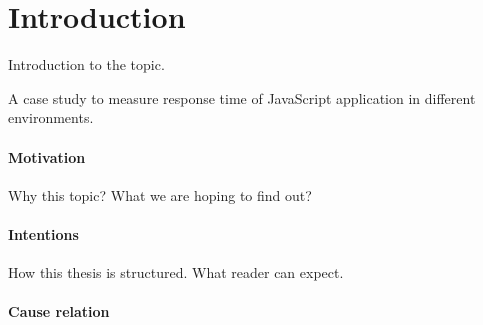\chapter{Introduction\label{intro}}

Introduction to the topic.

A case study to measure response time of JavaScript application in different environments. 

\subsubsection{Motivation}
Why this topic? What we are hoping to find out?

\subsubsection{Intentions}
How this thesis is structured.
What reader can expect.


\subsubsection{Cause relation}
